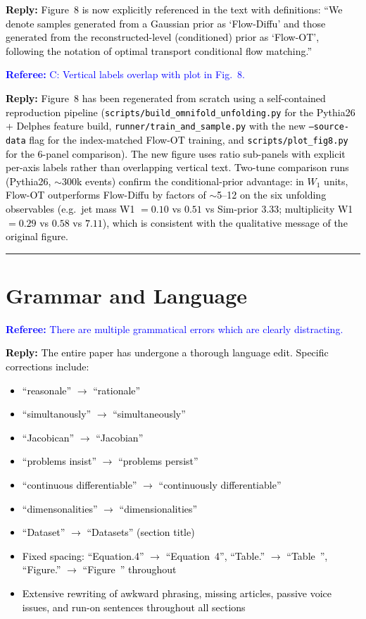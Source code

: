 \documentclass[11pt]{article}
\newcommand{\refcomment}[1]{\textcolor{blue}{\textbf{Referee:} #1}}
\newcommand{\reply}[1]{\textcolor{black}{\textbf{Reply:} #1}}
\begin{document}
\reply{Figure~8 is now explicitly referenced in the text with definitions: ``We denote samples generated from a Gaussian prior as `Flow-Diffu' and those generated from the reconstructed-level (conditioned) prior as `Flow-OT', following the notation of optimal transport conditional flow matching.''}

\bigskip

\refcomment{C: Vertical labels overlap with plot in Fig.~8.}

\reply{Figure~8 has been regenerated from scratch using a self-contained reproduction pipeline (\texttt{scripts/build\_omnifold\_unfolding.py} for the Pythia26 + Delphes feature build, \texttt{runner/train\_and\_sample.py} with the new \texttt{--source-data} flag for the index-matched Flow-OT training, and \texttt{scripts/plot\_fig8.py} for the 6-panel comparison). The new figure uses ratio sub-panels with explicit per-axis labels rather than overlapping vertical text. Two-tune comparison runs (Pythia26, $\sim\!300$k events) confirm the conditional-prior advantage: in $W_1$ units, Flow-OT outperforms Flow-Diffu by factors of $\sim$5--12 on the six unfolding observables (e.g.\ jet mass W1 $=0.10$ vs $0.51$ vs Sim-prior $3.33$; multiplicity W1 $=0.29$ vs $0.58$ vs $7.11$), which is consistent with the qualitative message of the original figure.}

\bigskip
\hrule
\bigskip

\section*{Grammar and Language}

\refcomment{There are multiple grammatical errors which are clearly distracting.}

\reply{The entire paper has undergone a thorough language edit. Specific corrections include:
\begin{itemize}
    \item ``reasonale'' $\to$ ``rationale''
    \item ``simultanously'' $\to$ ``simultaneously''
    \item ``Jacobican'' $\to$ ``Jacobian''
    \item ``problems insist'' $\to$ ``problems persist''
    \item ``continuous differentiable'' $\to$ ``continuously differentiable''
    \item ``dimensonalities'' $\to$ ``dimensionalities''
    \item ``Dataset'' $\to$ ``Datasets'' (section title)
    \item Fixed spacing: ``Equation.4'' $\to$ ``Equation~4'', ``Table.'' $\to$ ``Table~'', ``Figure.'' $\to$ ``Figure~'' throughout
    \item Extensive rewriting of awkward phrasing, missing articles, passive voice issues, and run-on sentences throughout all sections
\end{itemize}}
\end{document}
